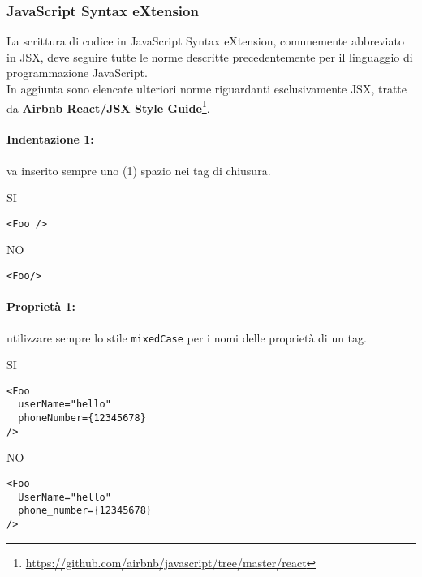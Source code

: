 \documentclass[../ProcessiPrimari.tex]{subfiles}
\begin{document}
	
	\subsubsection{JavaScript Syntax eXtension}
	La scrittura di codice in JavaScript Syntax eXtension, comunemente abbreviato in JSX, deve seguire tutte le norme descritte precedentemente per il linguaggio di programmazione JavaScript.\\
	In aggiunta sono elencate ulteriori norme riguardanti esclusivamente JSX, tratte da \textbf{Airbnb React/JSX Style Guide}\footnote{\href{https://github.com/airbnb/javascript/tree/master/react}{https://github.com/airbnb/javascript/tree/master/react}}. 

	\paragraph*{Indentazione 1: }
	va inserito sempre uno (1) spazio nei tag di chiusura.	
	\begin{center}{	
			\begin{minipage}{3cm}
				{\begin{center}SI\end{center}}
				\begin{Verbatim}[frame=single]
<Foo />
				\end{Verbatim}
			\end{minipage}
			\hfil
			\begin{minipage}{3cm}
				{\begin{center}NO\end{center}}
				\begin{Verbatim}[frame=single]
<Foo/>
				\end{Verbatim}
			\end{minipage}
		}
	\end{center}	
	\paragraph*{Proprietà 1: }
utilizzare sempre lo stile \texttt{mixedCase} per i nomi delle proprietà di un tag. 
	\begin{center}{
			\begin{minipage}{6cm}
				{\begin{center}SI\end{center}}
				\begin{Verbatim}[frame=single]
<Foo
  userName="hello"
  phoneNumber={12345678}
/>
				\end{Verbatim}
			\end{minipage}
			\hfil
			\begin{minipage}{6cm}
				{\begin{center}NO\end{center}}
				\begin{Verbatim}[frame=single]
<Foo
  UserName="hello"
  phone_number={12345678}
/>
				\end{Verbatim}
			\end{minipage}
		}
	\end{center}
\end{document}
